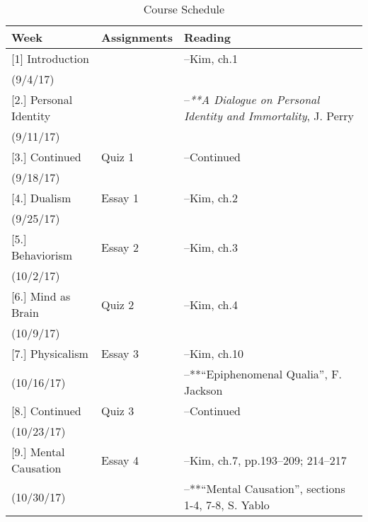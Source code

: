 \documentclass[article,oneside]{memoir}
\begin{document}
\begin{center}
\begin{longtable}{p{4.5cm}p{2cm}p{6cm}}
 
  \caption{Course Schedule} \\
  \toprule
  \textbf{Week} &\textbf{Assignments} & \textbf{Reading} \\
  \midrule


[1] Introduction		  		& 	 			& --Kim, ch.1  \\
(9/4/17)					&		  		&    \\ [1.8\baselineskip]

[2.] Personal Identity			& 				& --\emph{**A Dialogue on Personal Identity and Immortality}, J. Perry   \\
(9/11/17)			        		&			  	&   \\  [1.8\baselineskip]

[3.] Continued			    	& Quiz 1    		& --Continued  \\
(9/18/17)				         &		  	    	&   \\  [1.8\baselineskip]
	
[4.] Dualism			      	& Essay 1			& --Kim, ch.2 \\
(9/25/17)				        	& 			    	&  \\ [1.8\baselineskip]

[5.] Behaviorism		    	& Essay 2   		& --Kim, ch.3 \\
(10/2/17)			        		&		    	  	&  \\ [1.8\baselineskip]
  
[6.] Mind as Brain 		   	& Quiz 2	   		& --Kim, ch.4\\
(10/9/17)				         & 			    	& \\  [1.8\baselineskip]		

[7.] Physicalism		     		& Essay 3			& --Kim, ch.10 \\ 
(10/16/17)				      	&			      	& --**``Epiphenomenal Qualia'', F. Jackson \\ [1.8\baselineskip]
						
[8.] Continued 	      			& Quiz 3			&  --Continued \\
(10/23/17)				      	&			      	&  \\  [1.8\baselineskip]

[9.] Mental Causation 		& Essay 4			& --Kim, ch.7, pp.193--209; 214--217 \\
(10/30/17)				      	&	      			& --**``Mental Causation'', sections 1-4, 7-8, S. Yablo  \\  [1.8\baselineskip]


\end{longtable}
\end{center}
\end{document}

